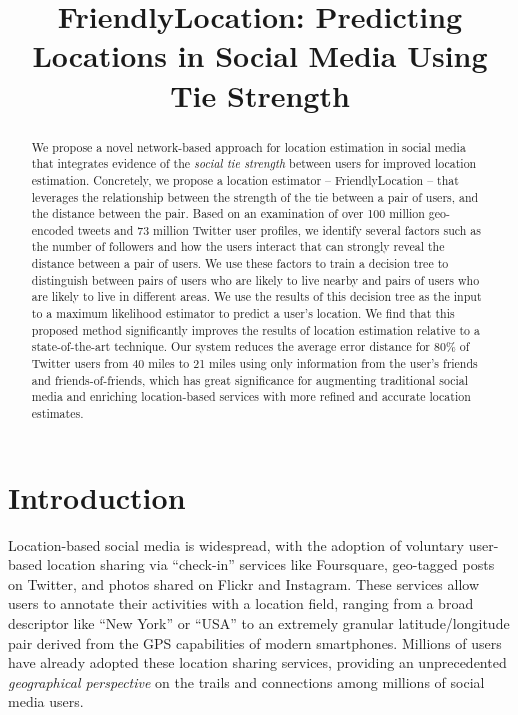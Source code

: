 \documentclass[letterpaper]{article}
\begin{document}
\title{FriendlyLocation: Predicting Locations in Social Media Using Tie Strength}

\maketitle
\begin{abstract}
We propose a novel network-based approach for location estimation in social
media that integrates evidence of the \textit{social tie strength} between
users for improved location estimation.
%
Concretely, we propose a location
estimator -- FriendlyLocation -- that leverages the relationship between the
strength of the tie between a pair of users, and the distance between the pair.
%
Based on an examination of over 100 million geo-encoded tweets and 73 million
Twitter user profiles, we identify several factors such as the
number of followers and how the users interact that can strongly reveal the
distance between a pair of users.
%
We use these factors to train a decision
tree to distinguish between pairs of users who are likely to live nearby and pairs of
users who are likely to live in different areas.
%
We use the results of this decision tree as the input to a maximum likelihood
estimator to predict a user's location.
We find that this proposed method significantly improves the results of
location estimation relative to a state-of-the-art technique.
Our system reduces the average error distance for 80\% of Twitter users from 40
miles to 21 miles using only information from the user's friends and
friends-of-friends,  which has great significance for augmenting traditional
social media and enriching location-based services with more refined and
accurate location estimates.
%
\end{abstract}

\section{Introduction}
Location-based social media is widespread, with the adoption of voluntary
user-based location sharing via ``check-in'' services like Foursquare,
geo-tagged posts on Twitter, and photos shared on Flickr and Instagram.
%
These services allow users to annotate their activities with a location field,
ranging from a broad descriptor like ``New York'' or ``USA'' to an extremely
granular latitude/longitude pair  derived from the GPS capabilities of modern
smartphones.
%
Millions of users have already adopted these location sharing services,
providing an unprecedented \textit{geographical perspective} on the trails and
connections among millions of social media users.
\end{document}
